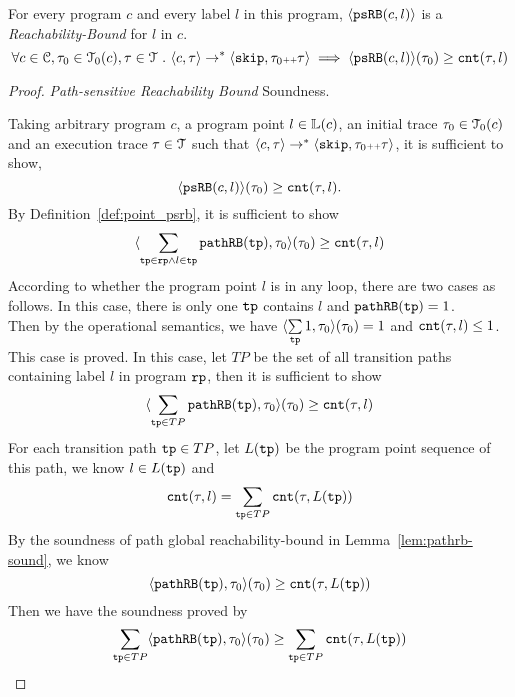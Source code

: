 \begin{theorem}
    For every program ${c}$ and every label $l$ in this program,
    $\langle \mathtt{psRB}(c, l) \rangle$ is a \emph{Reachability-Bound} for $l$ in $c$.
    \[
    \forall c \in \mathcal{C}, \mathtt{\tau}_0 \in \mathcal{T}_0(c), \mathtt{\tau} \in \mathcal{T} ~.~ 
    \langle {c}, \mathtt{\tau} \rangle \to^{*} \langle \mathtt{skip}, \mathtt{\tau}_0 {\scriptscriptstyle ++} \mathtt{\tau} \rangle 
    \implies \langle \mathtt{psRB}(c, l) \rangle(\mathtt{\tau}_0) \geq \mathtt{cnt}(\mathtt{\tau}, l) 
    \]
\end{theorem}

\begin{proof} \emph{Path-sensitive Reachability Bound} Soundness.

    Taking arbitrary program $c$, a program point $l \in \mathbb{L}(c)$, an initial trace $\mathtt{\tau}_0 \in \mathcal{T}_0(c)$ and an execution trace $\mathtt{\tau} \in \mathcal{T}$
    such that $\langle {c}, \mathtt{\tau} \rangle \to^{*} \langle \mathtt{skip}, \mathtt{\tau}_0 {\scriptscriptstyle ++} \mathtt{\tau} \rangle$,
    it is sufficient to show,
    \[
    \langle \mathtt{psRB}(c, l) \rangle(\mathtt{\tau}_0) \geq \mathtt{cnt}(\mathtt{\tau}, l) .
    \]
    By Definition~\ref{def:point_psrb}, it is sufficient to show 
    \[
    \langle \sum\limits_{\mathtt{tp} \in \mathtt{rp} \land  l \in \mathtt{tp}} \mathtt{pathRB}(\mathtt{tp}), \mathtt{\tau}_0 \rangle(\mathtt{\tau}_0)  \geq  \mathtt{cnt}(\mathtt{\tau}, l)
    \]
    According to whether the program point $l$ is in any loop, there are two cases as follows.
    In this case, there is only one $\mathtt{tp}$ contains $l$ and $\mathtt{pathRB}(\mathtt{tp}) = 1$.
    \\
    Then by the operational semantics, we have $\langle \sum\limits_{\mathtt{tp}} 1, \mathtt{\tau}_0 \rangle(\mathtt{\tau}_0) =  1$ and $ \mathtt{cnt}(\mathtt{\tau}, l) \leq 1$.
    \\
    This case is proved.
    In this case, let $TP$ be the set of all transition paths containing 
    label $l$ in program $\mathtt{rp}$, then it is sufficient to show 
    \[
        \langle \sum\limits_{\mathtt{tp} \in TP} \mathtt{pathRB}(\mathtt{tp}), \mathtt{\tau}_0 \rangle(\mathtt{\tau}_0)  \geq  \mathtt{cnt}(\mathtt{\tau}, l)
    \]
    For each transition path $\mathtt{tp} \in TP$, let $L(\mathtt{tp})$ be the program point sequence of this path, we know $l \in L(\mathtt{tp})$
    and 
    \[
        \mathtt{cnt}(\mathtt{\tau}, l) = \sum\limits_{\mathtt{tp} \in TP} \mathtt{cnt}(\mathtt{\tau}, L(\mathtt{tp}))
    \]
    By the soundness of path global reachability-bound in Lemma~\ref{lem:pathrb-sound}, we know
    \[
        \langle \mathtt{pathRB}(\mathtt{tp}), \mathtt{\tau}_0 \rangle(\mathtt{\tau}_0)  \geq  \mathtt{cnt}(\mathtt{\tau}, L(\mathtt{tp}))
    \]
    Then we have the soundness proved by
    \[
        \sum\limits_{\mathtt{tp} \in TP} \langle \mathtt{pathRB}(\mathtt{tp}), \mathtt{\tau}_0 \rangle(\mathtt{\tau}_0)  \geq \sum\limits_{\mathtt{tp} \in TP}  \mathtt{cnt}(\mathtt{\tau}, L(\mathtt{tp}))
    \]
\end{proof}
  
